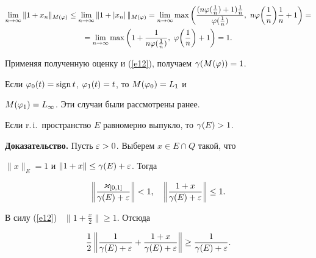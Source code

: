 \begin{multline*}


\liml{n\to\infty} \|1 + x_n\|_{M(\ph)} \le \liml{n\to \infty} 


\|1 + |x_n|\, \|_{M(\ph)} = 


\liml{n \to \infty} \max \bigg(\frac {(n\ph(\frac 1 n) + 


1) \frac 1 n } {\ph( \frac 1 n)}, \ 


n \ph\bigg( \frac 1 n \bigg) \frac 1 n + 1 \bigg) = \\


%


= \liml{n \to \infty} \max \bigg(1 + \frac 1 {n\ph( \frac 1 n) }, \ 


\ph\bigg( \frac 1 n \bigg) + 1 \bigg) =1. 


\end{multline*}


Применяя полученную оценку и (\ref{e12}), получаем $\gamma(M(\varphi))=1$. 


Если $\varphi_0 (t) = \operatorname{sign} t$, $\varphi_1 (t) =t$, то $M(\varphi_0) = L_1$ и


$M(\varphi_1) = L_\infty$. Эти случаи были рассмотрены ранее.





\begin{thm}\label{t22}


Если r.\,i.\ пространство $E$ равномерно выпукло, то $\gamma (E) >1$. 


\end{thm}





{\bf Доказательство.} Пусть $\varepsilon >0$. Выберем $x\in E \cap Q$ такой, что


$\|x\|_E =1$ и $\|1 + x\|\le \gamma(E) + \varepsilon$. Тогда


$$


\left\| \frac{\varkappa_{[0,1]}} {\gam(E)+\eps} \right\| <1,\quad


\left\| \frac {1 + x}{ \gam (E)+\eps } \right\| \le 1. 


$$


В силу (\ref{e12}) \ $\big\|1 + \frac x 2\big\| \ge 1$. Отсюда


$$


\frac 1 2\left\| \frac 1 {\gam (E) + \eps } + \frac {1 + x}


{\gam(E) +\eps} \right\| \ge \frac 1{\gam(E) + \eps}. 


$$


